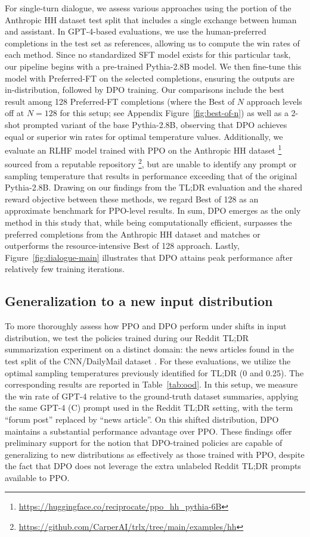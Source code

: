 For single-turn dialogue, we assess various approaches using the portion of the Anthropic HH dataset \citep{bai2022training} test split that includes a single exchange between human and assistant. In GPT-4-based evaluations, we use the human-preferred completions in the test set as references, allowing us to compute the win rates of each method. Since no standardized SFT model exists for this particular task, our pipeline begins with a pre-trained Pythia-2.8B model. We then fine-tune this model with Preferred-FT on the selected completions, ensuring the outputs are in-distribution, followed by DPO training. Our comparisons include the best result among 128 Preferred-FT completions (where the Best of $N$ approach levels off at $N=128$ for this setup; see Appendix Figure~\ref{fig:best-of-n}) as well as a 2-shot prompted variant of the base Pythia-2.8B, observing that DPO achieves equal or superior win rates for optimal temperature values. Additionally, we evaluate an RLHF model trained with PPO on the Anthropic HH dataset \footnote{\url{https://huggingface.co/reciprocate/ppo_hh_pythia-6B}} sourced from a reputable repository \footnote{\url{https://github.com/CarperAI/trlx/tree/main/examples/hh}}, but are unable to identify any prompt or sampling temperature that results in performance exceeding that of the original Pythia-2.8B. Drawing on our findings from the TL;DR evaluation and the shared reward objective between these methods, we regard Best of 128 as an approximate benchmark for PPO-level results. In sum, DPO emerges as the only method in this study that, while being computationally efficient, surpasses the preferred completions from the Anthropic HH dataset and matches or outperforms the resource-intensive Best of 128 approach. Lastly, Figure~\ref{fig:dialogue-main} illustrates that DPO attains peak performance after relatively few training iterations.

\subsection{Generalization to a new input distribution}

To more thoroughly assess how PPO and DPO perform under shifts in input distribution, we test the policies trained during our Reddit TL;DR summarization experiment on a distinct domain: the news articles found in the test split of the CNN/DailyMail dataset \citep{nallapati-etal-2016-abstractive}. For these evaluations, we utilize the optimal sampling temperatures previously identified for TL;DR (0 and 0.25). The corresponding results are reported in Table~\ref{tab:ood}. In this setup, we measure the win rate of GPT-4 relative to the ground-truth dataset summaries, applying the same GPT-4 (C) prompt used in the Reddit TL;DR setting, with the term ``forum post'' replaced by ``news article''. On this shifted distribution, DPO maintains a substantial performance advantage over PPO. These findings offer preliminary support for the notion that DPO-trained policies are capable of generalizing to new distributions as effectively as those trained with PPO, despite the fact that DPO does not leverage the extra unlabeled Reddit TL;DR prompts available to PPO.

